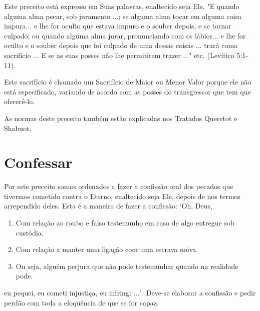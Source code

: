 Este preceito está expresso em Suas palavras, enaltecido seja Ele, "E
quando alguma alma pecar, sob juramento ...; se alguma alma tocar em
alguma coisa impura... e lhe for oculto que estava impuro e o souber
depois, e se tor­nar culpado; ou quando alguma alma jurar, pronunciando
com os lábios... e lhe for oculto e o souber depois que foi culpado de
uma dessas coisas ... trará como sacrifício ... E se as suas posses não
lhe permitirem trazer ..." etc. (Levíti­co 5:1-11).

Este sacrifício é chamado um Sacrifício de Maior ou Menor Valor por­que
ele não está especificado, variando de acordo com as posses do
transgres­sor que tem que oferecê-lo.

As normas deste preceito também estão explicadas nos Tratados Que­retot
e Shabuot.

\section{Confessar}

Por este preceito somos ordenados a fazer a confissão oral dos peca­dos
que tivermos cometido contra o Eterno, enaltecido seja Ele, depois de
nos termos arrependido deles. Esta é a maneira de fazer a confissão:
`Oh, Deus,


\begin{enumerate}
\def\labelenumi{\arabic{enumi}.}
\setcounter{enumi}{89}
\item
 
 Com relação ao roubo e falso testemunho em caso de algo entregue sob
 custódia.
 
\item
 
 Com relação a manter uma ligação com uma escrava noiva.
 
\item
 
 Ou seja, alguém perjura que não pode testemunhar quando na realidade
 pode.
 
\end{enumerate}




eu pequei, eu cometi injustiça, eu infringi ...". Deve-se elaborar a
confissão e pedir perdão com toda a eloqüência de que se for capaz.

